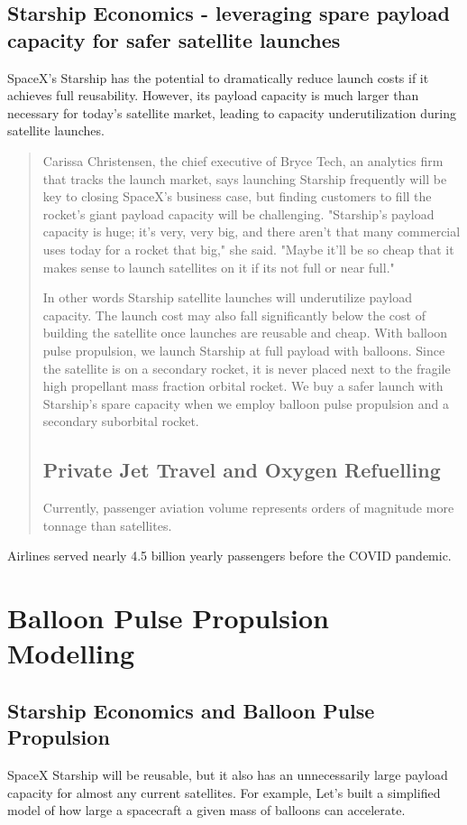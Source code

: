 \documentclass{article}
\begin{document}
\subsection{Starship Economics - leveraging spare payload capacity for safer satellite launches}
SpaceX’s Starship has the potential to dramatically reduce launch costs if it achieves full reusability. However, its payload capacity is much larger than necessary for today’s satellite market, leading to capacity underutilization during satellite launches.   \begin{quote}
Carissa Christensen, the chief executive of Bryce Tech, an analytics firm that tracks the launch market, says launching Starship frequently will be key to closing SpaceX’s business case, but finding customers to fill the rocket’s giant payload capacity will be challenging. 
"Starship's payload capacity is huge; it's very, very big, and there aren't that many commercial uses today for a rocket that big," she said.  "Maybe it'll be so cheap that it makes sense to launch satellites on it if its not full or near full." \cite{nyt_starship_size}

In other words Starship satellite launches will underutilize payload capacity.   The launch cost may also fall significantly below the cost of building the satellite once launches are reusable and cheap.   With balloon pulse propulsion, we launch Starship at full payload with balloons.   Since the satellite is on a secondary rocket, it is never placed next to the fragile high propellant mass fraction orbital rocket.   We buy a safer launch with Starship's spare capacity when we employ balloon pulse propulsion and a secondary suborbital rocket.

\subsection{Private Jet Travel and Oxygen Refuelling}
Currently, passenger aviation volume represents orders of magnitude more tonnage than satellites.  
\end{quote}  Airlines served nearly 4.5 billion yearly passengers before the COVID pandemic.  \cite{icao_passenger_volume}



\section{Balloon Pulse Propulsion Modelling}
\label{sec:pulse_modelling}
\subsection{Starship Economics and Balloon Pulse Propulsion}
SpaceX Starship will be reusable, but it also has an unnecessarily large payload capacity for almost any current satellites.   For example, 
Let's built a simplified model of how large a spacecraft a given mass of balloons can accelerate.
\end{document}
